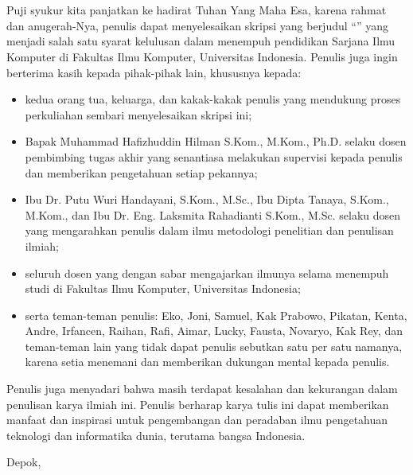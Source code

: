 \chapter*{\kataPengantar}
\pagestyle{first-pages}

Puji syukur kita panjatkan ke hadirat Tuhan Yang Maha Esa, karena rahmat dan anugerah-Nya, penulis dapat menyelesaikan skripsi yang berjudul “\judul” yang menjadi salah satu syarat kelulusan dalam menempuh pendidikan Sarjana Ilmu Komputer di  Fakultas Ilmu Komputer, Universitas Indonesia. Penulis juga ingin berterima kasih kepada pihak-pihak lain, khususnya kepada:

\begin{itemize}
    \setlength\itemsep{-0.5em}
    \item kedua orang tua, keluarga, dan kakak-kakak penulis yang mendukung proses perkuliahan sembari menyelesaikan skripsi ini;
    \item Bapak Muhammad Hafizhuddin Hilman S.Kom., M.Kom., Ph.D. selaku dosen pembimbing tugas akhir yang senantiasa melakukan supervisi kepada penulis dan memberikan pengetahuan setiap pekannya;
    \item Ibu Dr. Putu Wuri Handayani, S.Kom., M.Sc., Ibu Dipta Tanaya, S.Kom., M.Kom., dan Ibu Dr. Eng. Laksmita Rahadianti S.Kom., M.Sc. selaku dosen yang mengarahkan penulis dalam ilmu metodologi penelitian dan penulisan ilmiah;
    \item seluruh dosen yang dengan sabar mengajarkan ilmunya selama menempuh studi di Fakultas Ilmu Komputer, Universitas Indonesia;
    \item serta teman-teman penulis: Eko, Joni, Samuel, Kak Prabowo, Pikatan, Kenta, Andre, Irfancen, Raihan, Rafi, Aimar, Lucky, Fausta, Novaryo, Kak Rey, dan teman-teman lain yang tidak dapat penulis sebutkan satu per satu namanya, karena setia menemani dan memberikan dukungan mental kepada penulis.
\end{itemize}

Penulis juga menyadari bahwa masih terdapat kesalahan dan kekurangan dalam penulisan karya ilmiah ini. Penulis berharap karya tulis ini dapat memberikan manfaat dan inspirasi untuk pengembangan dan peradaban ilmu pengetahuan teknologi dan informatika dunia, terutama bangsa Indonesia.

\vspace*{0.1cm}
\begin{flushright}
Depok, \tanggalSiapSidang\\[0.1cm]
\vspace*{1.5cm}
\penulis

\end{flushright}
